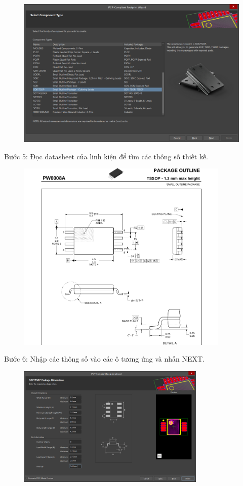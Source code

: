         \begin{figure}[H]
            \centering
            \includegraphics[width=1\textwidth]{pictures/ch3.6.png}
        \end{figure}
        \cleardoublepage
        Bước 5: Đọc datasheet của linh kiện để tìm các thông số thiết kế.
        \begin{figure}[H]
            \centering
            \includegraphics[width=0.9\textwidth]{pictures/ch3.7.png}
        \end{figure}
        Bước 6: Nhập các thông số vào các ô tương ứng và nhấn NEXT.
        \begin{figure}[H]
            \centering
            \includegraphics[width=0.8\textwidth]{pictures/ch3.8.png}
        \end{figure}
